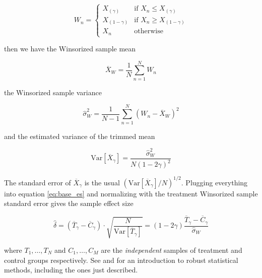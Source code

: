 \documentclass[a4paper,11pt]{kth-mag}
\begin{document}
\begin{equation}
W_n=\begin{cases}
X_{(\gamma)} & \text{if }X_n\leq X_{(\gamma)} \\
X_{(1-\gamma)} & \text{if }X_n\geq X_{(1-\gamma)} \\
X_n &\text{otherwise}
\end{cases}
\end{equation}

\noindent then we have the Winsorized sample mean

\begin{equation}
\overline{X}_W=\frac{1}{N}\sum_{n=1}^N W_n
\end{equation}

\noindent the Winsorized sample variance

\begin{equation}
\hat{\sigma}^2_W=\frac{1}{N-1}\sum_{n=1}^N (W_n-\overline{X}_W)^2
\end{equation}

\noindent and the estimated variance of the trimmed mean

\begin{equation}
\text{Var}[\overline{X}_\gamma]=\frac{\hat{\sigma}^2_W}{N(1-2\gamma)^2}
\end{equation}

The standard error of $\overline{X}_\gamma$ is the usual $(\text{Var}[\overline{X}_\gamma]/N)^{1/2}$. Plugging everything into equation \ref{eq:base_es} and normalizing with the treatment Winsorized sample standard error gives the sample effect size

\begin{equation}
\label{eq:effect_size}
\hat{\delta}=(\overline{T}_\gamma-\overline{C}_\gamma)\cdot\sqrt{\frac{N}{\text{Var}[\overline{T}_\gamma]}}
=(1-2\gamma)\frac{\overline{T}_\gamma-\overline{C}_\gamma}{\hat{\sigma}_W}
\end{equation}

\noindent where $T_1,\ldots,T_N$ and $C_1,\ldots,C_M$ are the \emph{independent} samples of treatment and control groups respectively. See  \cite{robust_stat} and \cite{modern_stat}for an introduction to robust statistical methods, including the ones just described.
\end{document}
